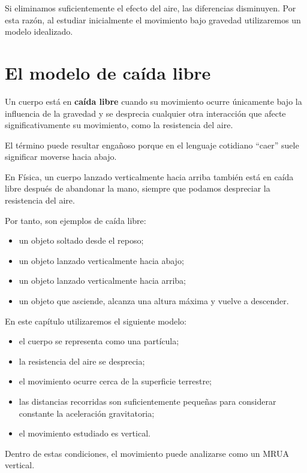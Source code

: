 Si eliminamos suficientemente el efecto del aire, las diferencias disminuyen. Por esta razón, al estudiar inicialmente el movimiento bajo gravedad utilizaremos un modelo idealizado.


\section{El modelo de caída libre}

\begin{definicion}
Un cuerpo está en \textbf{caída libre} cuando su movimiento ocurre únicamente bajo la influencia de la gravedad y se desprecia cualquier otra interacción que afecte significativamente su movimiento, como la resistencia del aire.
\end{definicion}

El término puede resultar engañoso porque en el lenguaje cotidiano ``caer'' suele significar moverse hacia abajo.

En Física, un cuerpo lanzado verticalmente hacia arriba también está en caída libre después de abandonar la mano, siempre que podamos despreciar la resistencia del aire.

Por tanto, son ejemplos de caída libre:

\begin{itemize}
    \item un objeto soltado desde el reposo;
    \item un objeto lanzado verticalmente hacia abajo;
    \item un objeto lanzado verticalmente hacia arriba;
    \item un objeto que asciende, alcanza una altura máxima y vuelve a descender.
\end{itemize}

\begin{modelo}
En este capítulo utilizaremos el siguiente modelo:

\begin{itemize}
    \item el cuerpo se representa como una partícula;
    \item la resistencia del aire se desprecia;
    \item el movimiento ocurre cerca de la superficie terrestre;
    \item las distancias recorridas son suficientemente pequeñas para considerar constante la aceleración gravitatoria;
    \item el movimiento estudiado es vertical.
\end{itemize}

Dentro de estas condiciones, el movimiento puede analizarse como un MRUA vertical.
\end{modelo}


